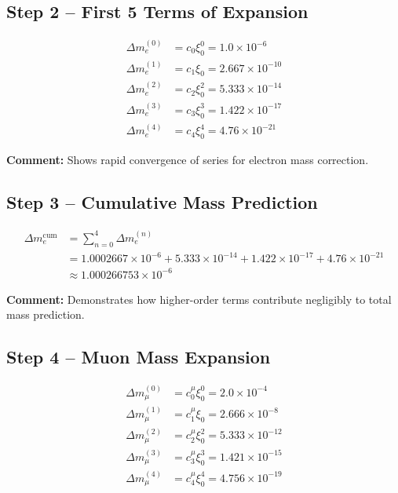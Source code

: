 \documentclass[12pt,a4paper]{article}
\begin{document}
\subsection{Step 2 – First 5 Terms of Expansion}

\begin{align}
	\Delta m_e^{(0)} &= c_0 \xi_0^0 = 1.0 \times 10^{-6} \\
	\Delta m_e^{(1)} &= c_1 \xi_0 = 2.667 \times 10^{-10} \\
	\Delta m_e^{(2)} &= c_2 \xi_0^2 = 5.333 \times 10^{-14} \\
	\Delta m_e^{(3)} &= c_3 \xi_0^3 = 1.422 \times 10^{-17} \\
	\Delta m_e^{(4)} &= c_4 \xi_0^4 = 4.76 \times 10^{-21}
\end{align}

\textbf{Comment:} Shows rapid convergence of series for electron mass correction.

\subsection{Step 3 – Cumulative Mass Prediction}

\begin{align}
	\Delta m_e^\text{cum} &= \sum_{n=0}^{4} \Delta m_e^{(n)} \\
	&= 1.0002667 \times 10^{-6} + 5.333 \times 10^{-14} + 1.422 \times 10^{-17} + 4.76 \times 10^{-21} \\
	&\approx 1.000266753 \times 10^{-6}
\end{align}

\textbf{Comment:} Demonstrates how higher-order terms contribute negligibly to total mass prediction.

\subsection{Step 4 – Muon Mass Expansion}

\begin{align}
	\Delta m_\mu^{(0)} &= c_0^\mu \xi_0^0 = 2.0 \times 10^{-4} \\
	\Delta m_\mu^{(1)} &= c_1^\mu \xi_0 = 2.666 \times 10^{-8} \\
	\Delta m_\mu^{(2)} &= c_2^\mu \xi_0^2 = 5.333 \times 10^{-12} \\
	\Delta m_\mu^{(3)} &= c_3^\mu \xi_0^3 = 1.421 \times 10^{-15} \\
	\Delta m_\mu^{(4)} &= c_4^\mu \xi_0^4 = 4.756 \times 10^{-19}
\end{align}
\end{document}
